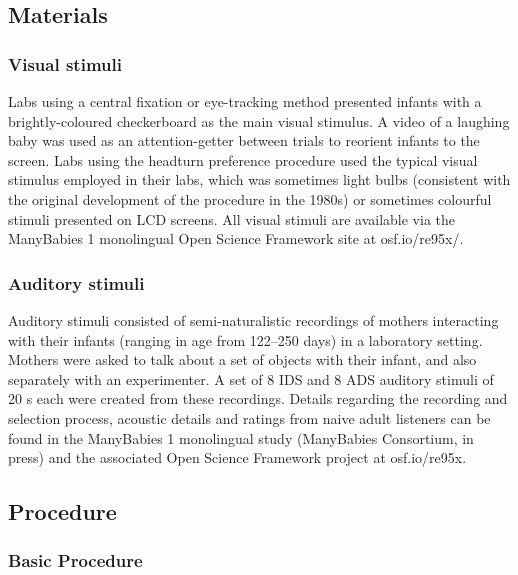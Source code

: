 \documentclass[,man,floatsintext]{apa6}
\begin{document}
\hypertarget{materials}{%
\subsection{Materials}\label{materials}}

\hypertarget{visual-stimuli}{%
\subsubsection{Visual stimuli}\label{visual-stimuli}}

Labs using a central fixation or eye-tracking method presented infants with a brightly-coloured checkerboard as the main visual stimulus. A video of a laughing baby was used as an attention-getter between trials to reorient infants to the screen. Labs using the headturn preference procedure used the typical visual stimulus employed in their labs, which was sometimes light bulbs (consistent with the original development of the procedure in the 1980s) or sometimes colourful stimuli presented on LCD screens. All visual stimuli are available via the ManyBabies 1 monolingual Open Science Framework site at osf.io/re95x/.

\hypertarget{auditory-stimuli}{%
\subsubsection{Auditory stimuli}\label{auditory-stimuli}}

Auditory stimuli consisted of semi-naturalistic recordings of mothers interacting with their infants (ranging in age from 122--250 days) in a laboratory setting. Mothers were asked to talk about a set of objects with their infant, and also separately with an experimenter. A set of 8 IDS and 8 ADS auditory stimuli of 20 s each were created from these recordings. Details regarding the recording and selection process, acoustic details and ratings from naive adult listeners can be found in the ManyBabies 1 monolingual study (ManyBabies Consortium, in press) and the associated Open Science Framework project at osf.io/re95x.

\hypertarget{procedure}{%
\subsection{Procedure}\label{procedure}}

\hypertarget{basic-procedure}{%
\subsubsection{Basic Procedure}\label{basic-procedure}}
\end{document}
